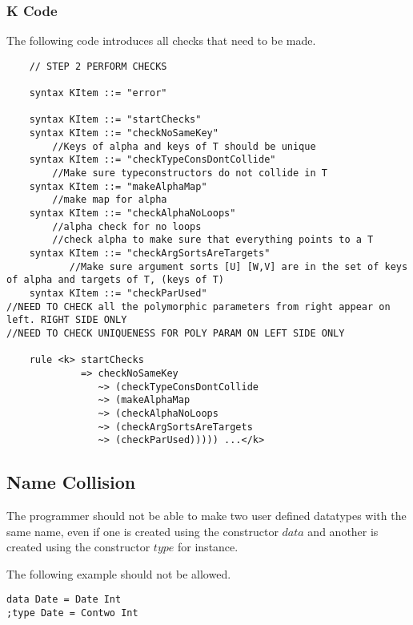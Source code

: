 \subsubsection{K Code}
The following code introduces all checks that need to be made.

\begin{lstlisting}
    // STEP 2 PERFORM CHECKS

    syntax KItem ::= "error"

    syntax KItem ::= "startChecks"
    syntax KItem ::= "checkNoSameKey"
        //Keys of alpha and keys of T should be unique
    syntax KItem ::= "checkTypeConsDontCollide"
        //Make sure typeconstructors do not collide in T
    syntax KItem ::= "makeAlphaMap"
        //make map for alpha
    syntax KItem ::= "checkAlphaNoLoops"
        //alpha check for no loops
        //check alpha to make sure that everything points to a T
    syntax KItem ::= "checkArgSortsAreTargets"
           //Make sure argument sorts [U] [W,V] are in the set of keys of alpha and targets of T, (keys of T)
    syntax KItem ::= "checkParUsed"
//NEED TO CHECK all the polymorphic parameters from right appear on left. RIGHT SIDE ONLY
//NEED TO CHECK UNIQUENESS FOR POLY PARAM ON LEFT SIDE ONLY

    rule <k> startChecks
             => checkNoSameKey
                ~> (checkTypeConsDontCollide
                ~> (makeAlphaMap
                ~> (checkAlphaNoLoops
                ~> (checkArgSortsAreTargets
                ~> (checkParUsed))))) ...</k>

\end{lstlisting}

\subsection{Name Collision}
The programmer should not be able to make two user defined datatypes with the same name, even if one is created using the constructor $data$ and another is created using the constructor $type$ for instance.

The following example should not be allowed.
\begin{lstlisting}
data Date = Date Int
;type Date = Contwo Int
\end{lstlisting}

